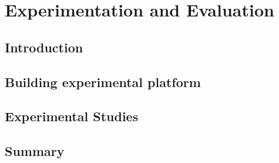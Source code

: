 \chapter{Experimentation and Evaluation} \label{exp-eva}


\section{Introduction} \label{exp-intro}
\section{Building experimental platform} \label{exp-env}
\section{Experimental Studies} \label{exp-stud}
\section{Summary} \label{exp-summ}



